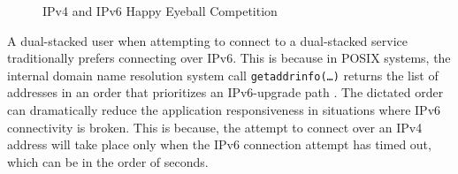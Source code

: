 \begin{figure}[t]
  \begin{minipage}[t]{0.50\textwidth}
    \centering
  \end{minipage}
  \begin{minipage}[t]{0.50\textwidth}
    \centering
  \end{minipage}
\caption{\label{fig:happy-v4-v6-compete}IPv4 and IPv6 Happy Eyeball Competition}
\end{figure}

A dual-stacked user when attempting to connect to a dual-stacked service
traditionally prefers connecting over IPv6. This is because in POSIX systems,
the internal domain name resolution system call \texttt{getaddrinfo(\ldots)}
\cite{rfc3493} returns the list of addresses in an order that prioritizes an
IPv6-upgrade path \cite{rfc6724}. The dictated order can dramatically reduce
the application responsiveness in situations where IPv6 connectivity is
broken. This is because, the attempt to connect over an IPv4 address will take
place only when the IPv6 connection attempt has timed out, which can be in the
order of seconds.

